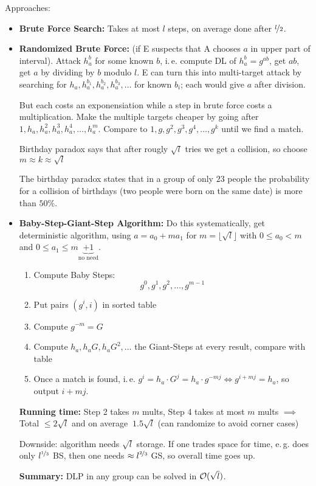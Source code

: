 Approaches:
\begin{itemize}
\item \textbf{Brute Force Search:} Takes at most $l$ steps, on average done after $\nicefrac{l}{2}$.
\item \textbf{Randomized Brute Force:} (if \textsc{E} suspects that \textsc{A} chooses $a$ in upper part of interval). Attack $h_a^b$ for some known $b$, i.\,e. compute \textsc{DL} of $h_a^b = g^{ab}$, get $ab$, get $a$ by dividing by $b$ modulo $l$. \textsc{E} can turn this into multi-target attack by searching for $h_a, h_a^{b_1}, h_a^{b_2}, h_a^{b_3}, \dots$ for known $b_i$; each would give $a$ after division.

But each costs an exponensiation while a step in brute force costs a multiplication. Make the multiple targets cheaper by going after $1, h_a, h_a^2, h_a^3, h_a^4, \dots, h_a^m$. Compare to $1, g, g^2, g^3, g^4, \dots, g^k$ until we find a match.

Birthday paradox says that after rougly $\sqrt{l}$ tries we get a collision, so choose $m \approx k \approx \sqrt{l}$
\begin{remark}
The birthday paradox states that in a group of only $23$ people the probability for a collision of birthdays (two people were born on the same date) is more than $50\%$.
\end{remark}
\item \textbf{Baby-Step-Giant-Step Algorithm:} Do this systematically, get deterministic algorithm, using $a= a_0 + m a_1$ for $m=\lfloor \sqrt{l}\rfloor$ with $0\leq a_0<m$ and $0\leq a_1\leq m\underbrace{+1}_{\text{no need}}$.
\begin{enumerate}
\item Compute Baby Steps:
\[ g^0, g^1, g^2, \dots, g^{m-1} \]
\item Put pairs $(g^i,i)$ in sorted table
\item Compute $g^{-m} = G$
\item Compute $h_a, h_aG, h_aG^2, \dots$ the Giant-Steps at every result, compare with table
\item Once a match is found, i.\,e. $g^i = h_a \cdot G^j = h_a \cdot g^{-mj} \iff g^{i+mj} = h_a$, so output $i+mj$.
\end{enumerate}
\textbf{Running time:} Step 2 takes $m$ mults, Step 4 takes at most $m$ mults $\implies$ Total $\leq 2 \sqrt{l}$ and on average $~1.5 \sqrt{l}$ (can randomize to avoid corner cases)

Downside: algorithm needs $\sqrt{l}$ storage. If one trades space for time, e.\,g. does only $l^{\nicefrac{1}{3}}$ BS, then one needs $\approx l^{\nicefrac{2}{3}}$ GS, so overall time goes up.

\textbf{Summary:} \textsc{DLP} in any group can be solved in $\mathcal O(\sqrt{l})$.
\end{itemize}

